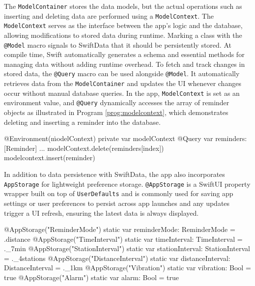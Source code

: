 The \lstinline{ModelContainer} stores the data models, but the actual operations such as inserting and deleting data are performed using a \lstinline{ModelContext}. 
The \lstinline{ModelContext} serves as the interface between the app's logic and the database, allowing modifications to stored data during runtime.
Marking a class with the \lstinline{@Model} macro signals to SwiftData that it should be persistently stored. 
At compile time, Swift automatically generates a schema and essential methods for managing data without adding runtime overhead.
To fetch and track changes in stored data, the \lstinline{@Query} macro can be used alongside \lstinline{@Model}.
It automatically retrieves data from the \lstinline{ModelContainer} and updates the \acs{UI} whenever changes occur without manual database queries.
In the app, \lstinline{ModelContext} is set as an environment value, and \lstinline{@Query} dynamically accesses the array of reminder objects as illustrated in Program \ref{prog:modelcontext}, which demonstrates deleting and inserting a reminder into the database.

\begin{program}[htbp]
    \begin{SwiftCode}
    @Environment(\.modelContext) private var modelContext
    @Query var reminders: [Reminder]
    ...
    modelContext.delete(reminders[index])
    modelcontext.insert(reminder)\end{SwiftCode}
    \caption{Using \lstinline{ModelContext} for modifying persistent data and \lstinline{@Query} for fetching data}
    \label{prog:modelcontext}
\end{program}

In addition to data persistence with SwiftData, the app also incorporates \lstinline{AppStorage} for lightweight preference storage. 
\lstinline{@AppStorage} is a SwiftUI property wrapper built on top of \lstinline{UserDefaults} and is commonly used for saving app settings or user preferences to persist across app launches and any updates trigger a \acs{UI} refresh, ensuring the latest data is always displayed.

\begin{program}[htbp]
    \begin{SwiftCode}
    @AppStorage("ReminderMode") static var reminderMode: ReminderMode = .distance
    @AppStorage("TimeInterval") static var timeInterval: TimeInterval = ._7min
    @AppStorage("StationInterval") static var stationInterval: StationInterval = ._4stations
    @AppStorage("DistanceInterval") static var distanceInterval: DistanceInterval = ._1km
    @AppStorage("Vibration") static var vibration: Bool = true
    @AppStorage("Alarm") static var alarm: Bool = true\end{SwiftCode}
    \caption{Using \lstinline{@AppStorage} to persist user preferences in the app}
    \label{prog:appstorage}
\end{program}

